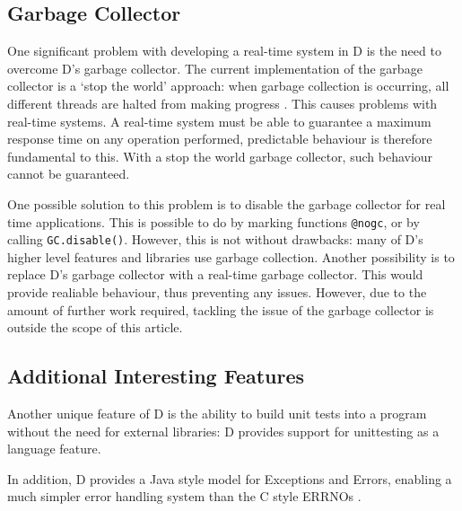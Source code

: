 \subsection{Garbage Collector}
One significant problem with developing a real-time system in D is the need to 
overcome D's garbage collector. The current implementation of the garbage 
collector is a `stop the world' approach: when garbage collection is occurring, 
all different threads are halted from making progress 
\cite{dlang-garbage}. This causes problems with 
real-time systems. A real-time system must be able to guarantee a maximum response 
time on any operation performed, predictable behaviour is therefore fundamental to this. 
With a stop the world garbage collector, such behaviour cannot be guaranteed. 
\par\bigskip\noindent
One possible solution to this problem is to disable the garbage collector for 
real time applications. This is possible to do by marking functions \texttt{@nogc}, 
or by calling \texttt{GC.disable()}. However, this is not without drawbacks: 
many of D's higher level features and libraries use garbage collection. 
Another possibility is to replace D's garbage collector with a real-time 
garbage collector. This would provide realiable behaviour, thus preventing any 
issues. However, 
due to the amount of further work required, tackling the issue of the garbage 
collector is outside the scope of this article.

\subsection{Additional Interesting Features}
Another unique feature of D is the ability to build unit tests into a 
program without the need for external libraries: D provides support for 
unittesting as a language feature. 
\par\bigskip\noindent
In addition, D provides a Java style model for Exceptions and Errors, enabling 
a much simpler error handling system than the C style ERRNOs 
\cite{ddili-book}. 

